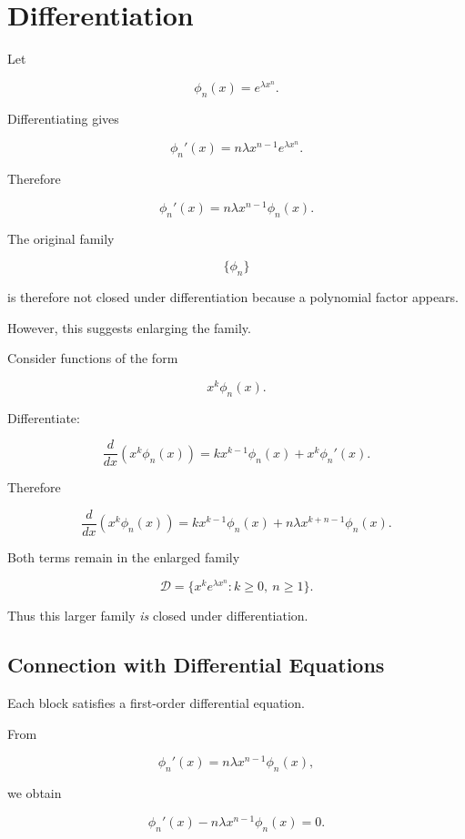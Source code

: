 
\chapter{Differentiation}


Let

\[
\phi_n(x)=e^{\lambda x^n}.
\]

Differentiating gives

\[
\phi_n'(x)
=
n\lambda x^{n-1}e^{\lambda x^n}.
\]

Therefore

\[
\boxed{
\phi_n'(x)
=
n\lambda x^{n-1}\phi_n(x).
}
\]

The original family

\[
\{
\phi_n
\}
\]

is therefore not closed under differentiation because a polynomial
factor appears.

However, this suggests enlarging the family.

Consider functions of the form

\[
x^k\phi_n(x).
\]

Differentiate:

\[
\frac{d}{dx}
\left(
x^k\phi_n(x)
\right)
=
kx^{k-1}\phi_n(x)
+
x^k\phi_n'(x).
\]

Therefore

\[
\boxed{
\frac{d}{dx}
\left(
x^k\phi_n(x)
\right)
=
kx^{k-1}\phi_n(x)
+
n\lambda x^{k+n-1}\phi_n(x).
}
\]

Both terms remain in the enlarged family

\[
\boxed{
\mathcal{D}
=
\{
x^k e^{\lambda x^n}
:
k\geq0,\ n\geq1
\}.
}
\]

Thus this larger family \emph{is} closed under differentiation.

\section{Connection with Differential Equations}

Each block satisfies a first-order differential equation.

From

\[
\phi_n'(x)
=
n\lambda x^{n-1}\phi_n(x),
\]

we obtain

\[
\boxed{
\phi_n'(x)
-
n\lambda x^{n-1}\phi_n(x)
=
0.
}
\]

